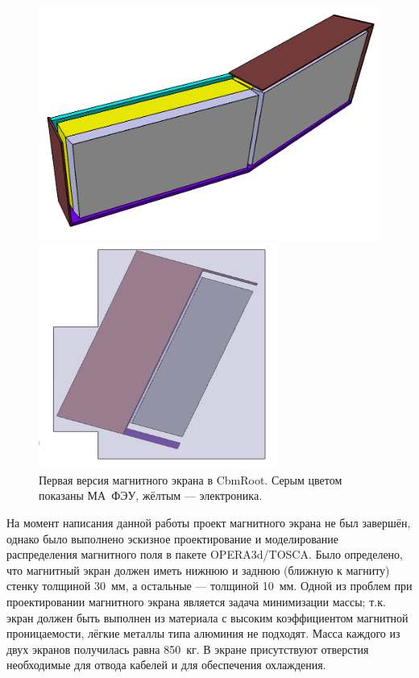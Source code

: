 \begin{figure}[H]
\begin{minipage}[b]{0.495\textwidth}
\includegraphics[width=1.0\textwidth]{pictures/ShieldingBox_MC.png}
\end{minipage}
\hspace{0.01\textwidth}
\begin{minipage}[b]{0.495\textwidth}
\includegraphics[width=0.7\textwidth]{pictures/ShieldingBox_MC2.png}
\end{minipage}
\caption{Первая версия магнитного экрана в CbmRoot. Серым цветом показаны МА~ФЭУ, жёлтым --- электроника.}
\label{fig:ShieldingBoxMC}
\end{figure}

На момент написания данной работы проект магнитного экрана не был завершён, однако было выполнено эскизное проектирование и моделирование распределения магнитного поля в пакете OPERA3d/TOSCA. Было определено, что магнитный экран должен иметь нижнюю и заднюю (ближную к магниту) стенку толщиной 30~мм, а остальные --- толщиной 10~мм. Одной из проблем при проектировании магнитного экрана является задача минимизации массы; т.к. экран должен быть выполнен из материала с высоким коэффициентом магнитной проницаемости, лёгкие металлы типа алюминия не подходят. Масса каждого из двух экранов получилась равна 850~кг. В экране присутствуют отверстия необходимые для отвода кабелей и для обеспечения охлаждения.

